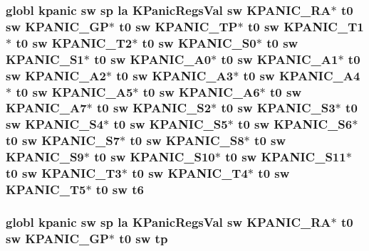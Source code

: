 \hypertarget{riscv_2kpanica_8S_a9a1b6cca190f4179183f3ddcd14f12a1}{
\subsubsection[{t6}]{\setlength{\rightskip}{0pt plus 5cm}globl {\bf kpanic} {\bf sw} {\bf sp} {\bf la} {\bf K\-Panic\-Regs\-Val} {\bf sw} {\bf K\-P\-A\-N\-I\-C\-\_\-\-R\-A}$\ast$ {\bf t0} {\bf sw} {\bf K\-P\-A\-N\-I\-C\-\_\-\-G\-P}$\ast$ {\bf t0} {\bf sw} {\bf K\-P\-A\-N\-I\-C\-\_\-\-T\-P}$\ast$ {\bf t0} {\bf sw} {\bf K\-P\-A\-N\-I\-C\-\_\-\-T1}$\ast$ {\bf t0} {\bf sw} {\bf K\-P\-A\-N\-I\-C\-\_\-\-T2}$\ast$ {\bf t0} {\bf sw} {\bf K\-P\-A\-N\-I\-C\-\_\-\-S0}$\ast$ {\bf t0} {\bf sw} {\bf K\-P\-A\-N\-I\-C\-\_\-\-S1}$\ast$ {\bf t0} {\bf sw} {\bf K\-P\-A\-N\-I\-C\-\_\-\-A0}$\ast$ {\bf t0} {\bf sw} {\bf K\-P\-A\-N\-I\-C\-\_\-\-A1}$\ast$ {\bf t0} {\bf sw} {\bf K\-P\-A\-N\-I\-C\-\_\-\-A2}$\ast$ {\bf t0} {\bf sw} {\bf K\-P\-A\-N\-I\-C\-\_\-\-A3}$\ast$ {\bf t0} {\bf sw} {\bf K\-P\-A\-N\-I\-C\-\_\-\-A4}$\ast$ {\bf t0} {\bf sw} {\bf K\-P\-A\-N\-I\-C\-\_\-\-A5}$\ast$ {\bf t0} {\bf sw} {\bf K\-P\-A\-N\-I\-C\-\_\-\-A6}$\ast$ {\bf t0} {\bf sw} {\bf K\-P\-A\-N\-I\-C\-\_\-\-A7}$\ast$ {\bf t0} {\bf sw} {\bf K\-P\-A\-N\-I\-C\-\_\-\-S2}$\ast$ {\bf t0} {\bf sw} {\bf K\-P\-A\-N\-I\-C\-\_\-\-S3}$\ast$ {\bf t0} {\bf sw} {\bf K\-P\-A\-N\-I\-C\-\_\-\-S4}$\ast$ {\bf t0} {\bf sw} {\bf K\-P\-A\-N\-I\-C\-\_\-\-S5}$\ast$ {\bf t0} {\bf sw} {\bf K\-P\-A\-N\-I\-C\-\_\-\-S6}$\ast$ {\bf t0} {\bf sw} {\bf K\-P\-A\-N\-I\-C\-\_\-\-S7}$\ast$ {\bf t0} {\bf sw} {\bf K\-P\-A\-N\-I\-C\-\_\-\-S8}$\ast$ {\bf t0} {\bf sw} {\bf K\-P\-A\-N\-I\-C\-\_\-\-S9}$\ast$ {\bf t0} {\bf sw} {\bf K\-P\-A\-N\-I\-C\-\_\-\-S10}$\ast$ {\bf t0} {\bf sw} {\bf K\-P\-A\-N\-I\-C\-\_\-\-S11}$\ast$ {\bf t0} {\bf sw} {\bf K\-P\-A\-N\-I\-C\-\_\-\-T3}$\ast$ {\bf t0} {\bf sw} {\bf K\-P\-A\-N\-I\-C\-\_\-\-T4}$\ast$ {\bf t0} {\bf sw} {\bf K\-P\-A\-N\-I\-C\-\_\-\-T5}$\ast$ {\bf t0} {\bf sw} t6}}\label{riscv_2kpanica_8S_a9a1b6cca190f4179183f3ddcd14f12a1}
\hypertarget{riscv_2kpanica_8S_a1a7742348ea558c7a4b41d4272eb6acd}{
\subsubsection[{tp}]{\setlength{\rightskip}{0pt plus 5cm}globl {\bf kpanic} {\bf sw} {\bf sp} {\bf la} {\bf K\-Panic\-Regs\-Val} {\bf sw} {\bf K\-P\-A\-N\-I\-C\-\_\-\-R\-A}$\ast$ {\bf t0} {\bf sw} {\bf K\-P\-A\-N\-I\-C\-\_\-\-G\-P}$\ast$ {\bf t0} {\bf sw} tp}}\label{riscv_2kpanica_8S_a1a7742348ea558c7a4b41d4272eb6acd}
